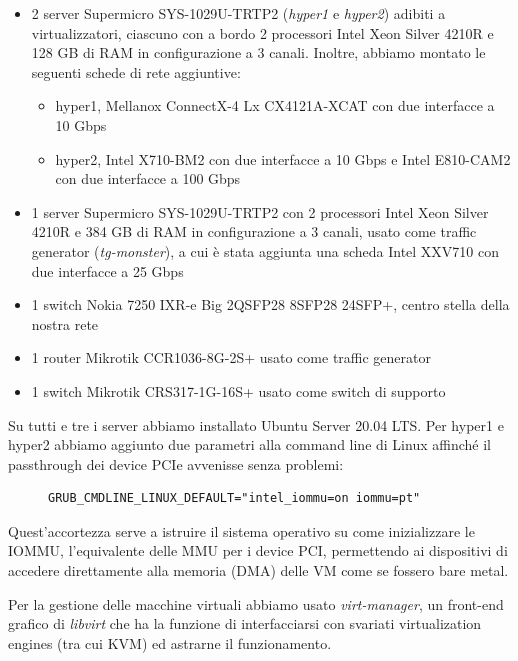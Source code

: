 \begin{itemize}
    \item 2 server Supermicro SYS-1029U-TRTP2 (\textit{hyper1} e \textit{hyper2}) adibiti a virtualizzatori, ciascuno con a bordo 2 processori Intel Xeon Silver 4210R e 128 GB di RAM in configurazione a 3 canali. Inoltre, abbiamo montato le seguenti schede di rete aggiuntive:
    \begin{itemize}
        \item hyper1, Mellanox ConnectX-4 Lx CX4121A-XCAT con due interfacce a 10 Gbps
        \item hyper2, Intel X710-BM2 con due interfacce a 10 Gbps e Intel E810-CAM2 con due interfacce a 100 Gbps
    \end{itemize}
    \item 1 server Supermicro SYS-1029U-TRTP2 con 2 processori Intel Xeon Silver 4210R e 384 GB di RAM in configurazione a 3 canali, usato come traffic generator (\mbox{\textit{tg-monster}}), a cui è stata aggiunta una scheda Intel XXV710 con due interfacce a 25 Gbps
    \item 1 switch Nokia 7250 IXR-e Big 2QSFP28 8SFP28 24SFP+, centro stella della nostra rete
    \item 1 router Mikrotik CCR1036-8G-2S+ usato come traffic generator
    \item 1 switch Mikrotik CRS317-1G-16S+ usato come switch di supporto
\end{itemize}

Su tutti e tre i server abbiamo installato Ubuntu Server 20.04 LTS. Per hyper1 e hyper2 abbiamo aggiunto due parametri alla command line di Linux affinché il passthrough dei device PCIe avvenisse senza problemi:

\begin{figure}[h!]
\centering
\begin{BVerbatim}
GRUB_CMDLINE_LINUX_DEFAULT="intel_iommu=on iommu=pt"
\end{BVerbatim}
\end{figure}

Quest'accortezza serve a istruire il sistema operativo su come inizializzare le \mbox{IOMMU}, l'equivalente delle MMU per i device PCI, permettendo ai dispositivi di accedere direttamente alla memoria (DMA) delle VM come se fossero bare metal.

Per la gestione delle macchine virtuali abbiamo usato \textit{virt-manager}, un front-end grafico di \textit{libvirt} che ha la funzione di interfacciarsi con svariati virtualization engines (tra cui KVM) ed astrarne il funzionamento.

